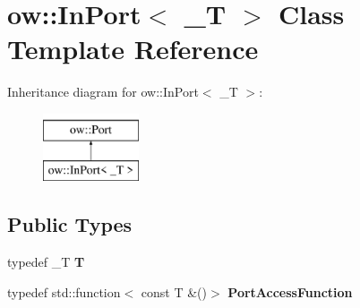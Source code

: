 \hypertarget{classow_1_1InPort}{}\section{ow\+:\+:In\+Port$<$ \+\_\+T $>$ Class Template Reference}
\label{classow_1_1InPort}
Inheritance diagram for ow\+:\+:In\+Port$<$ \+\_\+T $>$\+:\begin{figure}[H]
\begin{center}
\leavevmode
\includegraphics[height=2.000000cm]{d6/d68/classow_1_1InPort}
\end{center}
\end{figure}
\subsection*{Public Types}
\begin{DoxyCompactItemize}
\item 
typedef \+\_\+T {\bfseries T}\hypertarget{classow_1_1InPort_a9d3656356ee551e2e1bfb07888ac61a0}{}\label{classow_1_1InPort_a9d3656356ee551e2e1bfb07888ac61a0}

\item 
typedef std\+::function$<$ const T \&()$>$ {\bfseries Port\+Access\+Function}\hypertarget{classow_1_1InPort_af7b5b88cc0c6c8d1f654727381edad4c}{}\label{classow_1_1InPort_af7b5b88cc0c6c8d1f654727381edad4c}

\end{DoxyCompactItemize}
